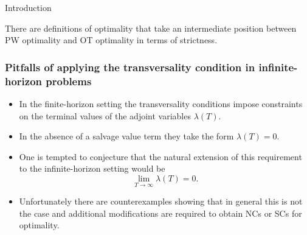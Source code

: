 \documentclass[10pt]{beamer}
\theoremstyle{definition}
\begin{document}
\begin{section}{Introduction}
\begin{frame}[fragile]
There are definitions of optimality that take an intermediate position between PW optimality and OT optimality in terms of strictness.
\end{frame}

\begin{frame}[fragile]
\frametitle{Pitfalls of applying the transversality condition in infinite-horizon problems}
\begin{itemize}\itemsep1em
\item In the finite-horizon setting the transversality conditions impose constraints on the terminal values of the adjoint variables $ \lambda(T) $. 
\item In the absence of a salvage value term they take the form $ \lambda(T)=0 $.
\item One is tempted to conjecture that the natural extension of this requirement to the infinite-horizon setting would be \[ \lim\limits_{T\rightarrow \infty}\lambda(T)=0 . \]
\item Unfortunately there are counterexamples showing that in general this is not the case and additional modifications are required to obtain NCs or SCs for optimality.
\end{itemize}
\end{frame}
\end{section}
\end{document}
